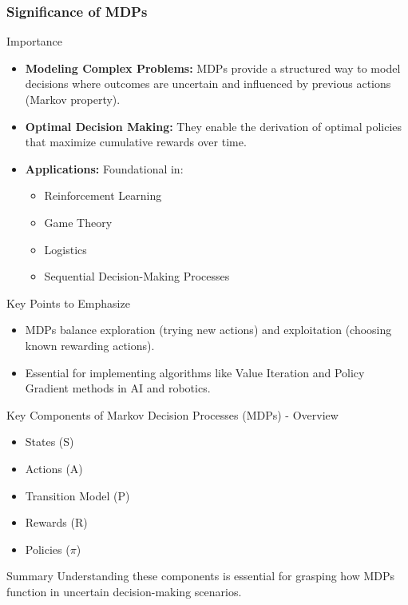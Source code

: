 \documentclass[aspectratio=169]{beamer}
\begin{document}
\begin{frame}[fragile]
    \frametitle{Significance of MDPs}
    \begin{block}{Importance}
        \begin{itemize}
            \item \textbf{Modeling Complex Problems:} MDPs provide a structured way to model decisions where outcomes are uncertain and influenced by previous actions (Markov property).
            \item \textbf{Optimal Decision Making:} They enable the derivation of optimal policies that maximize cumulative rewards over time.
            \item \textbf{Applications:} Foundational in:
            \begin{itemize}
                \item Reinforcement Learning
                \item Game Theory
                \item Logistics
                \item Sequential Decision-Making Processes
            \end{itemize}
        \end{itemize}
    \end{block}
    \begin{block}{Key Points to Emphasize}
        \begin{itemize}
            \item MDPs balance exploration (trying new actions) and exploitation (choosing known rewarding actions).
            \item Essential for implementing algorithms like Value Iteration and Policy Gradient methods in AI and robotics.
        \end{itemize}
    \end{block}
\end{frame}

\begin{frame}[fragile]{Key Components of Markov Decision Processes (MDPs) - Overview}
    \begin{itemize}
        \item States (S)
        \item Actions (A)
        \item Transition Model (P)
        \item Rewards (R)
        \item Policies (\(\pi\))
    \end{itemize}
    \begin{block}{Summary}
        Understanding these components is essential for grasping how MDPs function in uncertain decision-making scenarios. 
    \end{block}
\end{frame}
\end{document}
